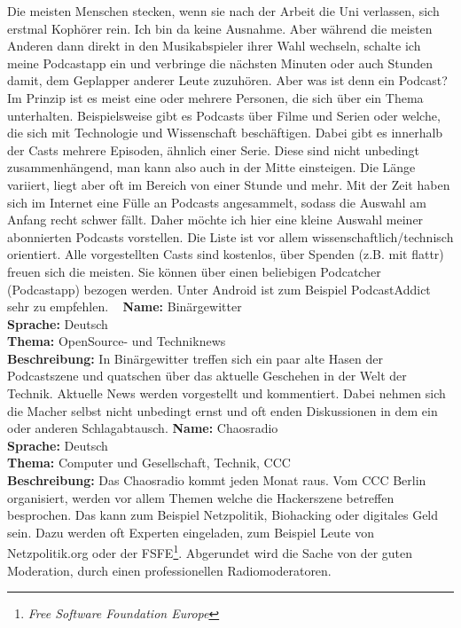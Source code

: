 {Die meisten Menschen stecken, wenn sie nach der Arbeit die Uni verlassen, sich erstmal Kophörer rein. Ich bin da keine Ausnahme. Aber während die meisten Anderen dann direkt in den
Musikabspieler ihrer Wahl wechseln, schalte ich meine Podcastapp ein und verbringe die nächsten Minuten oder auch Stunden damit, dem Geplapper anderer Leute zuzuhören.
Aber was ist denn ein Podcast? Im Prinzip ist es meist eine oder mehrere Personen, die sich über ein Thema unterhalten. Beispielsweise gibt es Podcasts über Filme und Serien oder welche, die sich mit Technologie und Wissenschaft beschäftigen. Dabei gibt es innerhalb der Casts mehrere Episoden, ähnlich einer Serie. Diese sind nicht unbedingt zusammenhängend, man kann also auch in der Mitte einsteigen. Die Länge variiert, liegt aber oft im Bereich von einer Stunde und mehr. 
Mit der Zeit haben sich im Internet eine Fülle an Podcasts angesammelt, sodass die Auswahl am Anfang recht schwer fällt. Daher möchte ich hier eine kleine Auswahl meiner abonnierten Podcasts vorstellen. Die Liste ist vor allem wissenschaftlich/technisch orientiert. Alle vorgestellten Casts sind kostenlos, über Spenden (z.B. mit flattr)
freuen sich die meisten. Sie können über einen beliebigen Podcatcher (Podcastapp) bezogen werden. Unter Android ist zum Beispiel PodcastAddict sehr zu empfehlen.
\vfill\columnbreak
~\vfill
\textbf{Name: }Binärgewitter\\
\textbf{Sprache: }Deutsch\\
\textbf{Thema: }OpenSource- und Techniknews\\
\textbf{Beschreibung: }In Binärgewitter treffen sich ein paar alte Hasen der Podcastszene und quatschen über das aktuelle Geschehen in der Welt der Technik. 
Aktuelle News werden vorgestellt und kommentiert. Dabei nehmen sich die Macher selbst nicht unbedingt ernst und oft enden Diskussionen in dem ein oder anderen
Schlagabtausch. 
\vfill\vfill
\textbf{Name: }Chaosradio\\
\textbf{Sprache: }Deutsch\\
\textbf{Thema: }Computer und Gesellschaft, Technik, CCC\\
\textbf{Beschreibung: }Das Chaosradio kommt jeden Monat raus. Vom CCC Berlin organisiert, werden vor allem Themen welche die Hackerszene betreffen besprochen. Das kann zum Beispiel Netzpolitik, Biohacking oder digitales Geld sein. Dazu werden oft Experten eingeladen, zum Beispiel Leute von Netzpolitik.org oder der FSFE\footnote{\textit{Free Software Foundation Europe}}. Abgerundet wird die Sache von der guten Moderation, durch einen professionellen Radiomoderatoren.
}

